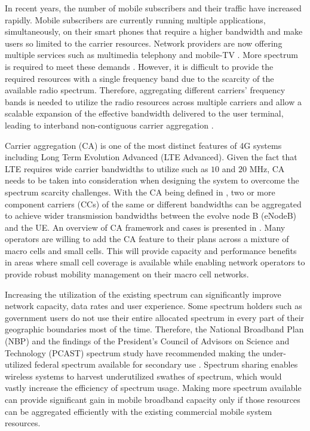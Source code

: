 \documentclass[journal]{IEEEtran} 		\usepackage{amsmath,amssymb}
\begin{document}
In recent years, the number of mobile subscribers and their traffic have increased rapidly. Mobile subscribers are currently running multiple applications, simultaneously, on their smart phones that require a higher bandwidth and make users so limited to the carrier resources. Network providers are now offering multiple services such as multimedia telephony and mobile-TV \cite{QoS_3GPP}. More spectrum is required to meet these demands \cite{Carrier_Agg_1}. However, it is difficult to provide the required resources with a single frequency band due to the scarcity of the available radio spectrum. Therefore, aggregating different carriers' frequency bands is needed to utilize the radio resources across multiple carriers and allow a scalable expansion of the effective bandwidth delivered to the user terminal, leading to interband non-contiguous carrier aggregation \cite{Carrier_Agg_2}.

Carrier aggregation (CA) is one of the most distinct features of 4G systems including Long Term Evolution Advanced (LTE Advanced). Given the fact that LTE requires wide carrier bandwidths to utilize such as $10$ and $20$ MHz, CA needs to be taken into consideration when designing the system to overcome the spectrum scarcity challenges. With the CA being defined in \cite{work-item}, two or more component carriers (CCs) of the same or different bandwidths can be aggregated to achieve wider transmission bandwidths between the evolve node B (eNodeB) and the UE. An overview of CA framework and cases is presented in \cite{CA-framework}. Many operators are willing to add the CA feature to their plans across a mixture of macro cells and small cells. This will provide capacity and performance benefits in areas where small cell coverage is available while enabling network operators to provide robust mobility management on their macro cell networks.

Increasing the utilization of the existing spectrum can significantly improve network capacity, data rates and user experience. Some spectrum holders such as government users do not use their entire allocated spectrum in every part of their geographic boundaries most of the time. Therefore, the National Broadband Plan (NBP) and the findings of the President's Council of Advisors on Science and Technology (PCAST) spectrum study have recommended making the under-utilized federal spectrum available for secondary use \cite{PCAST}. Spectrum sharing enables wireless systems to harvest underutilized swathes of spectrum, which would vastly increase the efficiency of spectrum usage. Making more spectrum available can provide significant gain in mobile broadband capacity only if those resources can be aggregated efficiently with the existing commercial mobile system resources.
\end{document}
